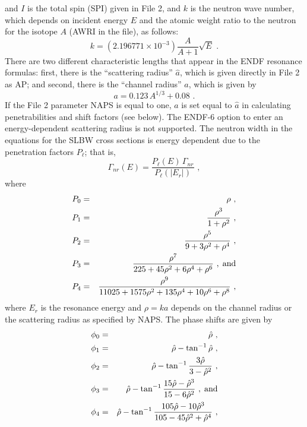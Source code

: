 and $I$ is the total spin (SPI) given in File 2, and $k$ is the
neutron wave number, which depends on incident energy $E$ and the
atomic weight ratio to the neutron for the isotope $A$ (AWRI in
the file), as follows:
\begin{equation}
   k=(2.196771{\times}10^{-3}){\frac{A}{A+1}}\sqrt{E}\,\,.
\end{equation}
There are two different characteristic lengths that appear in the
ENDF resonance formulas:  first, there is the ``scattering
radius'' $\hat a$, which is given
directly in File 2 as AP; and second, there is the ``channel
radius'' $a$, which is given by
\begin{equation}
   a=0.123\,A^{1/3}+0.08\,\,.
\end{equation}
If the File 2 parameter NAPS is equal to one, $a$ is set equal to
$\hat a$ in calculating penetrabilities and shift factors (see
below).  The ENDF-6 option to enter an energy-dependent
scattering radius is not supported.  The neutron width in the
equations for the SLBW cross sections is energy dependent due to
the penetration factors $P_\ell$;  that is,
\begin{equation}
   \Gamma_{nr}(E)={\frac{P_\ell(E)\,\Gamma_{nr}}{P_\ell(|E_r|)}}\,\,,
\end{equation}
where
\begin{eqnarray}
  P_0&=&\rho\,\,,\\
  P_1&=&{\frac{\rho^3}{1+\rho^2}}\,\,,\\
  P_2&=&{\frac{\rho^5}{9+3\rho^2+\rho^4}}\,\,,\\
  P_3&=&{\frac{\rho^7}{225+45\rho^2+6\rho^4+\rho^6}}\,\,,
              \;\hbox{and}\\
  P_4&=&{\frac{\rho^9}{11025+1575\rho^2+135\rho^4+10\rho^6+\rho^8}}\,\,,
\end{eqnarray}
where $E_r$ is the resonance energy and $\rho{=}ka$ depends on
the channel radius or the scattering radius as specified by NAPS.
The phase shifts are given by
\begin{eqnarray}
  \phi_0&=&\hat\rho\,\,,\\
  \phi_1&=&\hat\rho - \tan^{-1}\hat\rho \,\,,\\
  \phi_2&=&\hat\rho - \tan^{-1}{\frac{3\hat\rho}
    {3-\hat\rho^2}} \,\,,\\
  \phi_3&=&\hat\rho - \tan^{-1}{\frac{15\hat\rho-\hat\rho^3}
    {15-6\hat\rho^2}} \,\,,\;\hbox{and}\\
  \phi_4&=&\hat\rho - \tan^{-1}{\frac{105\hat\rho-10\hat\rho^3}
    {105-45\hat\rho^2+\hat\rho^4}}\,\,,
\end{eqnarray}
